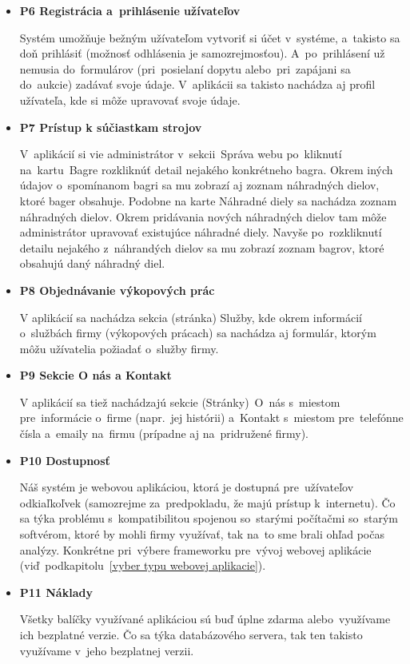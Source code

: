 \begin{itemize}
\item \textbf{P6 Registrácia a~prihlásenie užívateľov}

Systém umožňuje bežným užívateľom vytvoriť si účet v~systéme, a~takisto sa doň prihlásiť (možnosť odhlásenia je samozrejmosťou). A~po~prihlásení už nemusia do~formulárov (pri~posielaní dopytu alebo~pri~zapájani sa do~aukcie) zadávať svoje údaje. V~aplikácii sa takisto nachádza aj profil užívateľa, kde si môže upravovať svoje údaje.

\item \textbf{P7 Prístup k súčiastkam strojov}

V~aplikácií si vie administrátor v~sekcii~Správa webu po~kliknutí na~kartu~Bagre rozkliknúť detail nejakého konkrétneho bagra. Okrem iných údajov o~spomínanom bagri sa mu zobrazí aj zoznam náhradných dielov, ktoré bager obsahuje. Podobne na karte Náhradné diely sa nachádza zoznam náhradných dielov. Okrem pridávania nových náhradných dielov tam môže administrátor upravovať existujúce náhradné diely. Navyše po~rozkliknutí detailu nejakého z~náhrandých dielov sa mu zobrazí zoznam bagrov, ktoré obsahujú daný náhradný diel.

\item \textbf{P8 Objednávanie výkopových prác}

V aplikácií sa nachádza sekcia (stránka) Služby, kde okrem informácií o~službách firmy (výkopových prácach) sa nachádza aj formulár, ktorým môžu užívatelia požiadať o~služby firmy.

\item \textbf{P9 Sekcie O nás a Kontakt}

V aplikácií sa tiež nachádzajú sekcie (Stránky)~O~nás s~miestom pre~informácie o~firme (napr.~jej histórii) a~Kontakt s~miestom pre~telefónne čísla a~emaily na~firmu (prípadne aj na~pridružené firmy).

\item \textbf{P10 Dostupnosť}

Náš systém je webovou aplikáciou, ktorá je dostupná pre~užívateľov odkiaľkoľvek (samozrejme za~predpokladu, že majú prístup k~internetu). Čo sa týka problému s~kompatibilitou spojenou so~starými počítačmi so~starým softvérom, ktoré by mohli firmy využívať, tak na~to sme brali ohľad počas analýzy. Konkrétne pri~výbere frameworku pre~vývoj webovej aplikácie (viď~podkapitolu~\ref{vyber typu webovej aplikacie}).

\item \textbf{P11 Náklady}

Všetky balíčky využívané aplikáciou sú buď úplne zdarma alebo~využívame ich bezplatné verzie. Čo sa týka databázového servera, tak ten takisto využívame v~jeho bezplatnej verzii.
\end{itemize}

